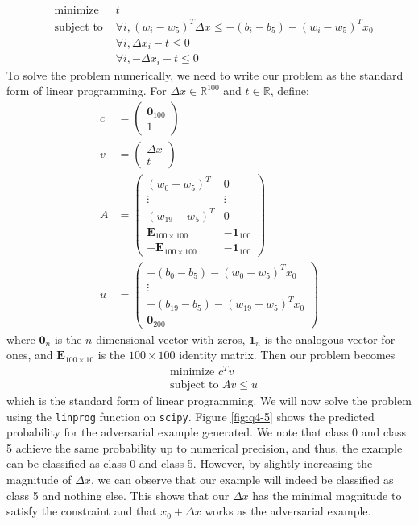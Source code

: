 \documentclass[
	12pt, %
]{../Template/fphw}
\begin{document}
\begin{enumerate}[label = (\arabic*)]
    \begin{align}
        &\textrm{minimize } &t \\
        &\textrm{subject to } &\forall i, (w_i-w_5)^T \Delta x \leq -(b_i-b_5) - (w_i-w_5)^Tx_0  \\
        & & \forall i, \Delta x_i -t \leq 0\\
        & & \forall i, -\Delta x_i -t \leq 0
    \end{align}
    To solve the problem numerically, we need to write our problem as the standard form of linear programming. For $\Delta x\in \mathbb{R}^{100}$ and $t\in \mathbb{R}$, define:
    \begin{align}
        c &= \begin{pmatrix}\textbf{0}_{100} \\ 1\end{pmatrix}\\
        v &= \begin{pmatrix} \Delta x \\ t \end{pmatrix} \\
        A &= \begin{pmatrix}
            (w_0-w_5)^T & 0 \\
            \vdots & \vdots \\
            (w_{19}-w_5)^T & 0 \\
            \textbf{E}_{100\times 100} & -\textbf{1}_{100} \\
            -\textbf{E}_{100\times 100} & -\textbf{1}_{100}
        \end{pmatrix} \\
        u &= \begin{pmatrix}-(b_0-b_5) - (w_0-w_5)^T x_0 \\ \vdots \\ -(b_{19}-b_5) - (w_{19}-w_5)^T x_0 \\ \textbf{0}_{200}\end{pmatrix}
    \end{align}
    where $\textbf{0}_{n}$ is the $n$ dimensional vector with zeros, $\textbf{1}_n$ is the analogous vector for ones, and $\textbf{E}_{100\times 10}$ is the $100\times 100$ identity matrix. Then our problem becomes
    \begin{align}
        &\textrm{minimize } c^T v \\
        &\textrm{subject to }  Av \leq u
    \end{align}
    which is the standard form of linear programming. We will now solve the problem using the \verb|linprog| function on \verb|scipy|. Figure \ref{fig:q4-5} shows the predicted probability for the adversarial example generated. We note that class 0 and class 5 achieve the same probability up to numerical precision, and thus, the example can be classified as class 0 and class 5. However, by slightly increasing the magnitude of $\Delta x$, we can observe that our example will indeed be classified as class 5 and nothing else. This shows that our $\Delta x$ has the minimal magnitude to satisfy the constraint and that $x_0+\Delta x$ works as the adversarial example.

\end{enumerate}
\end{document}
